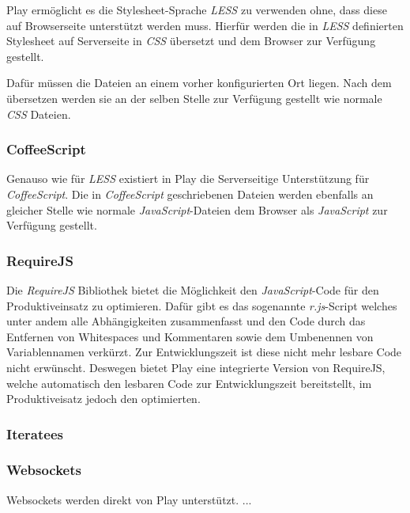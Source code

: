 Play ermöglicht es die Stylesheet-Sprache \textit{LESS} zu verwenden ohne,  dass diese auf
Browserseite unterstützt werden muss. Hierfür werden die in  \textit{LESS} definierten Stylesheet
auf Serverseite in \textit{CSS} übersetzt  und dem Browser zur Verfügung gestellt.

Dafür müssen die Dateien an einem vorher konfigurierten Ort liegen. Nach dem  übersetzen werden sie
an der selben Stelle zur Verfügung gestellt wie normale  \textit{CSS} Dateien.

\subsubsection{CoffeeScript}

Genauso wie für \textit{LESS} existiert in Play die Serverseitige Unterstützung  für
\textit{CoffeeScript}. Die in \textit{CoffeeScript} geschriebenen Dateien  werden ebenfalls an
gleicher Stelle wie normale \textit{JavaScript}-Dateien dem  Browser als \textit{JavaScript} zur
Verfügung gestellt.

\subsubsection{RequireJS}

Die \textit{RequireJS} Bibliothek bietet die Möglichkeit den  \textit{JavaScript}-Code für den
Produktiveinsatz zu optimieren. Dafür gibt es  das sogenannte \textit{r.js}-Script welches unter
andem alle Abhängigkeiten  zusammenfasst und den Code durch das Entfernen von Whitespaces und
Kommentaren  sowie dem Umbenennen von Variablennamen verkürzt. Zur Entwicklungszeit ist diese  nicht
mehr lesbare Code nicht erwünscht. Deswegen bietet Play eine integrierte  Version von RequireJS,
welche automatisch den lesbaren Code zur Entwicklungszeit  bereitstellt, im Produktiveisatz jedoch
den optimierten.

\subsubsection{Iteratees}

\subsubsection{Websockets}

Websockets werden direkt von Play unterstützt. ...